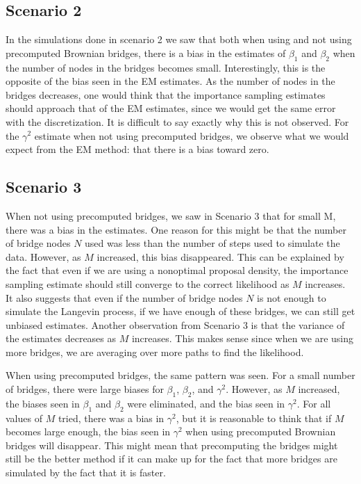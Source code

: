 \subsection{Scenario 2}
\label{subsec: scenario 2 interpretation}

In the simulations done in scenario 2 we saw that both when using and not using precomputed Brownian bridges, there is a bias in the estimates of $\beta_1$ and $\beta_2$ when the number of nodes in the bridges becomes small. Interestingly, this is the opposite of the bias seen in the EM estimates. As the number of nodes in the bridges decreases, one would think that the importance sampling estimates should approach that of the EM estimates, since we would get the same error with the discretization. It is difficult to say exactly why this is not observed. For the $\gamma^2$ estimate when not using precomputed bridges, we observe what we would expect from the EM method: that there is a bias toward zero.




\subsection{Scenario 3}
\label{subsec: scenario 3 interpretation}


When not using precomputed bridges, we saw in Scenario 3  that for small M, there was a bias in the estimates. One reason for this might be that the number of bridge nodes $N$ used was less than the number of steps used to simulate the data. However, as $M$ increased, this bias disappeared. This can be explained by the fact that even if we are using a nonoptimal proposal density, the importance sampling estimate should still converge to the correct likelihood as $M$ increases. It also suggests that even if the number of bridge nodes $N$ is not enough to simulate the Langevin process, if we have enough of these bridges, we can still get unbiased estimates. Another observation from Scenario 3 is that the variance of the estimates decreases as $M$ increases. This makes sense since when we are using more bridges, we are averaging over more paths to find the likelihood.


When using precomputed bridges, the same pattern was seen. For a small number of bridges, there were large biases for $\beta_1$, $\beta_2$, and $\gamma^2$. However, as $M$ increased, the biases seen in $\beta_1$ and $\beta_2$ were eliminated, and the bias seen in $\gamma^2$. For all values of $M$ tried, there was a bias in $\gamma^2$, but it is reasonable to think that if $M$ becomes large enough, the bias seen in $\gamma^2$ when using precomputed Brownian bridges will disappear. This might mean that precomputing the bridges might still be the better method if it can make up for the fact that more bridges are simulated by the fact that it is faster.


